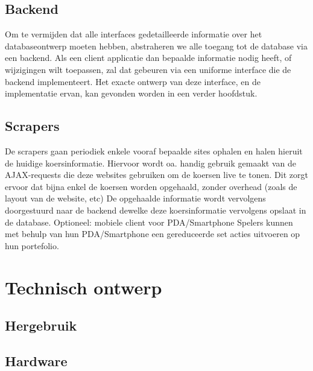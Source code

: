 \section{Backend}

Om te vermijden dat alle interfaces gedetailleerde informatie over het databaseontwerp moeten hebben, abstraheren we alle toegang tot de database via een backend. Als een client applicatie dan bepaalde informatie nodig heeft, of wijzigingen wilt toepassen, zal dat gebeuren via een uniforme interface die de backend implementeert. Het exacte ontwerp van deze interface, en de implementatie ervan, kan gevonden worden in een verder hoofdstuk.

\section{Scrapers}

De scrapers gaan periodiek enkele vooraf bepaalde sites ophalen en halen hieruit de huidige koersinformatie. Hiervoor wordt oa. handig gebruik gemaakt van de AJAX-requests die deze websites gebruiken om de koersen live te tonen. Dit zorgt ervoor dat bijna enkel de koersen worden opgehaald, zonder overhead (zoals de layout van de website, etc) 
De opgehaalde informatie wordt vervolgens doorgestuurd naar de backend dewelke deze koersinformatie vervolgens opslaat in de database. 
Optioneel: mobiele client voor PDA/Smartphone 
Spelers kunnen met behulp van hun PDA/Smartphone een gereduceerde set acties uitvoeren op hun portefolio.


%
%

\chapter{Technisch ontwerp}

\section{Hergebruik}


\section{Hardware}

